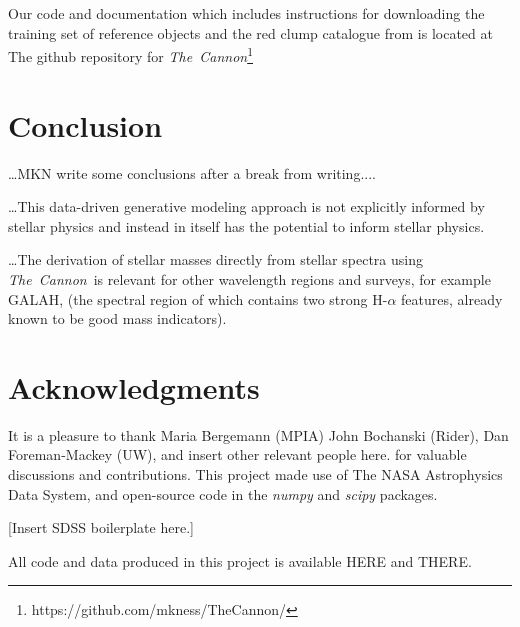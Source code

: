 \documentclass[12pt, preprint]{aastex}
\newcommand{\project}[1]{\textsl{#1}}
\newcommand{\tc}{\project{The~Cannon}}
\begin{document}
Our code and documentation which includes instructions for downloading the training set of reference objects and the red clump catalogue from \citet{Bovy2014} is located at The github repository for \tc \footnote{https://github.com/mkness/TheCannon/}






\section{Conclusion} 

\ldots MKN write some conclusions after a break from writing.... 

\ldots This data-driven generative modeling approach is not explicitly informed by stellar physics and instead in itself has the potential to inform stellar physics.

\ldots The derivation of stellar masses directly from stellar spectra using \tc\ is relevant for other wavelength regions and surveys, for example GALAH, (the spectral region of which contains two strong H-$\alpha$ features, already known to be good mass indicators). 

\section*{Acknowledgments}
It is a pleasure to thank Maria Bergemann (MPIA)
  John Bochanski (Rider),
  Dan Foreman-Mackey (UW), and
insert other relevant people here.
for valuable discussions and contributions.
This project made use of
  The NASA Astrophysics Data System,
  and open-source code in the \project{numpy} and \project{scipy} packages.

[Insert SDSS boilerplate here.]

All code and data produced in this project is available HERE and THERE.


\end{document}
